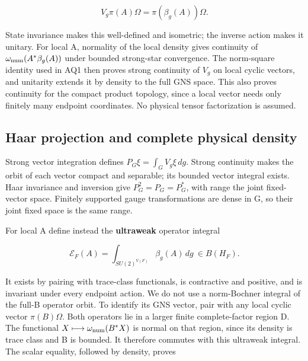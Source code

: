 \begin{equation}
V_g\pi(A)\Omega=\pi(\beta_g(A))\Omega.\tag{HNM-AQ2.1}
\label{r29:aq2:eq1}
\end{equation}

State invariance makes this well-defined and isometric; the inverse action makes it unitary. For local A, normality of the local density gives continuity of \(\omega_{\rm num}(A^*\beta_g(A))\) under bounded strong-star convergence. The norm-square identity used in AQ1 then proves strong continuity of \(V_g\) on local cyclic vectors, and unitarity extends it by density to the full GNS space. This also proves continuity for the compact product topology, since a local vector needs only finitely many endpoint coordinates. No physical tensor factorization is assumed.

\hypertarget{r29-aq2-haar-projection-and-complete-physical-density}{%
\subsection{Haar projection and complete physical density}\label{r29:aq2:r29-aq2-haar-projection-and-complete-physical-density}}

Strong vector integration defines \(P_G\xi=\int_GV_g\xi\,dg\). Strong continuity makes the orbit of each vector compact and separable; its bounded vector integral exists. Haar invariance and inversion give \(P_G^2=P_G=P_G^*\), with range the joint fixed-vector space. Finitely supported gauge transformations are dense in G, so their joint fixed space is the same range.

For local A define instead the \textbf{ultraweak} operator integral

\begin{equation}
\mathcal E_F(A)=\int_{SU(2)^{V(F)}}\beta_g(A)\,dg\ \in B(H_F).
\tag{HNM-AQ2.2}
\label{r29:aq2:eq2}
\end{equation}

It exists by pairing with trace-class functionals, is contractive and positive, and is invariant under every endpoint action. We do not use a norm-Bochner integral of the full-B operator orbit. To identify its GNS vector, pair with any local cyclic vector \(\pi(B)\Omega\). Both operators lie in a larger finite complete-factor region D. The functional \(X\longmapsto\omega_{\rm num}(B^*X)\) is normal on that region, since its density is trace class and B is bounded. It therefore commutes with this ultraweak integral. The scalar equality, followed by density, proves

